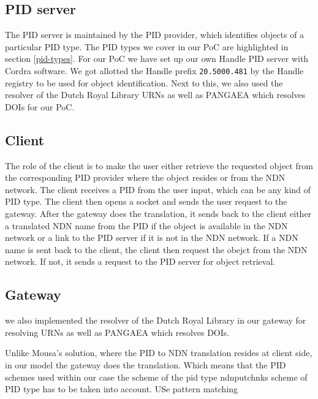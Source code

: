 \subsection{PID server}
The PID server is maintained by the PID provider, which identifies objects of a particular PID type. The PID types we cover in our PoC are highlighted in section \ref{pid-types}. For our PoC we have set up our own Handle PID server with Cordra software. We got allotted the Handle prefix \texttt{20.5000.481} by the Handle registry to be used for object identification. Next to this, we also used the resolver of the Dutch Royal Library URNs as well as PANGAEA which resolves DOIs for our PoC.

\subsection{Client}
The role of the client is to make the user either retrieve the requested object from the corresponding PID provider where the object resides or from the NDN network. 
The client receives a PID from the user input, which can be any kind of PID type. The client then opens a socket and sends the user request to the gateway. After the gateway does the translation, it sends back to the client either a translated NDN name from the PID if the object is available in the NDN network or a link to the PID server if it is not in the NDN network. If a NDN name is sent back to the client, the client then request the obejct from the NDN network. If not, it sends a request to the PID server for object retrieval.


\subsection{Gateway}
we also implemented the resolver of the Dutch Royal Library in our gateway for resolving URNs as well as PANGAEA which resolves DOIs. 

Unlike Mousa's solution, where the PID to NDN translation resides at client side, in our model the gateway does the translation. Which means that the PID schemes used within our case
the scheme of the pid type
ndnputchnks
scheme of PID type has to be taken into account. USe pattern matching

